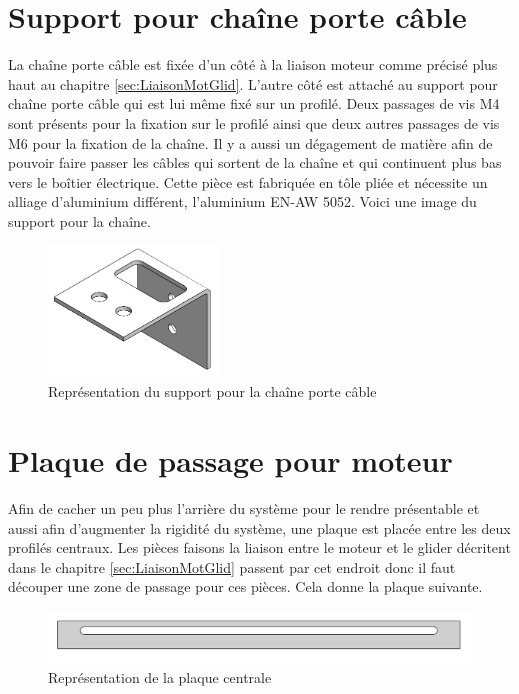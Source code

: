 \section{Support pour chaîne porte câble}\label{sec:SupChainCable}
La chaîne porte câble est fixée d'un côté à la liaison moteur comme précisé plus haut au chapitre \ref{sec:LiaisonMotGlid}. L'autre côté est
attaché au support pour chaîne porte câble qui est lui même fixé sur un profilé. Deux passages de vis M4 sont présents pour la fixation sur
le profilé ainsi que deux autres passages de vis M6 pour la fixation de la chaîne. Il y a aussi un dégagement de matière afin de pouvoir faire
passer les câbles qui sortent de la chaîne et qui continuent plus bas vers le boîtier électrique. Cette pièce est fabriquée en tôle pliée et
nécessite un alliage d'aluminium différent, l'aluminium EN-AW 5052. Voici une image du support pour la chaîne.

\begin{figure}[H]
    \centering
    \includegraphics[width = 0.4\textwidth]{assets/figures/SupportChaineCable.png}
    \caption{Représentation du support pour la chaîne porte câble}
    \label{fig:SupChaineCable}
\end{figure}

\section{Plaque de passage pour moteur}\label{sec:PlaPassMot}
Afin de cacher un peu plus l'arrière du système pour le rendre présentable et aussi afin d'augmenter la rigidité du système, une plaque est placée
entre les deux profilés centraux. Les pièces faisons la liaison entre le moteur et le glider décritent dans le chapitre \ref{sec:LiaisonMotGlid}
passent par cet endroit donc il faut découper une zone de passage pour ces pièces. Cela donne la plaque suivante.

\begin{figure}[H]
    \centering
    \includegraphics[width = \textwidth]{assets/figures/PlaquePassageMoteur.png}
    \caption{Représentation de la plaque centrale}
    \label{fig:PLaPassMot}
\end{figure}

